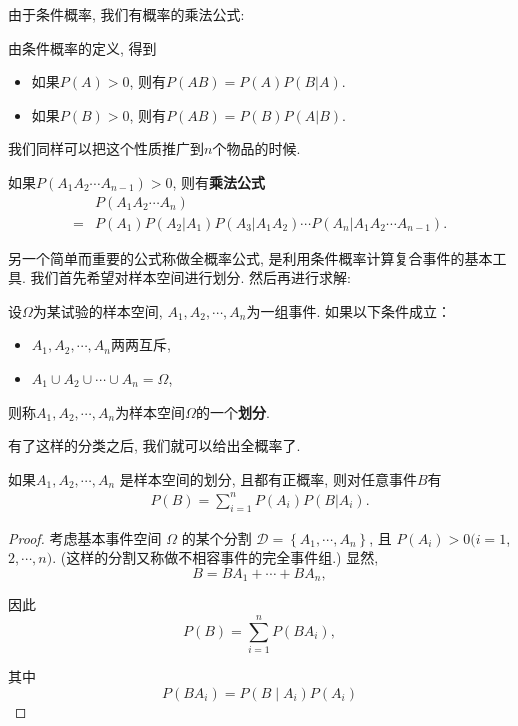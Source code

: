 由于条件概率, 我们有概率的乘法公式:

\begin{theorem}[乘法公式]
    由条件概率的定义, 得到
    \begin{itemize}
        \item 如果$P(A)>0$, 则有$P(AB)=P(A)P(B|A)$. 
        \item 如果$P(B)>0$, 则有$P(AB)=P(B)P(A|B)$. 
    \end{itemize}
\end{theorem}

我们同样可以把这个性质推广到$n$个物品的时候.

\begin{corollary}
    如果$P(A_1 A_2\cdots A_{n-1})>0$, 则有\textbf{乘法公式}
    \begin{align*}
          & P(A_1A_2\cdots A_n)                                                \\
        = & P(A_1)P(A_2|A_1)P(A_3|A_1 A_2)\cdots P(A_n|A_1 A_2\cdots A_{n-1}).
    \end{align*}
\end{corollary}



另一个简单而重要的公式称做全概率公式, 是利用条件概率计算复合事件的基本工具. 我们首先希望对样本空间进行划分. 然后再进行求解:

\begin{definition}
    设$\Omega$为某试验的样本空间, $A_1, A_2, \cdots, A_n$为一组事件. 如果以下条件成立：
    \begin{itemize}
        \item $A_1, A_2, \cdots, A_n$两两互斥, 
        \item $A_1 \cup A_2 \cup \cdots \cup A_n=\Omega$, 
    \end{itemize}
    则称$A_1, A_2, \cdots , A_n$为样本空间$\Omega$的一个\textbf{划分}. 
\end{definition}


有了这样的分类之后, 我们就可以给出全概率了.

\begin{theorem}[全概率公式]
    如果$A_1, A_2, \cdots, A_n$ 是样本空间的划分, 且都有正概率, 则对任意事件$B$有
    \begin{align*}
        P(B)=\sum_{i=1}^n P(A_i) P(B|A_i).
    \end{align*}
\end{theorem}

\begin{proof}
    考虑基本事件空间 $\Omega$ 的某个分割 $\mathscr{D}=\left\{A_1, \cdots, A_n\right\}$, 且 $P\left(A_i\right)>0(i=1$, $2, \cdots, n)$. (这样的分割又称做不相容事件的完全事件组.) 显然,
$$
B=B A_1+\cdots+B A_n,
$$

因此
$$
P(B)=\sum_{i=1}^n P\left(B A_i\right),
$$

其中
$$
P\left(B A_i\right)=P\left(B \mid A_i\right) P\left(A_i\right)
$$
\end{proof}


